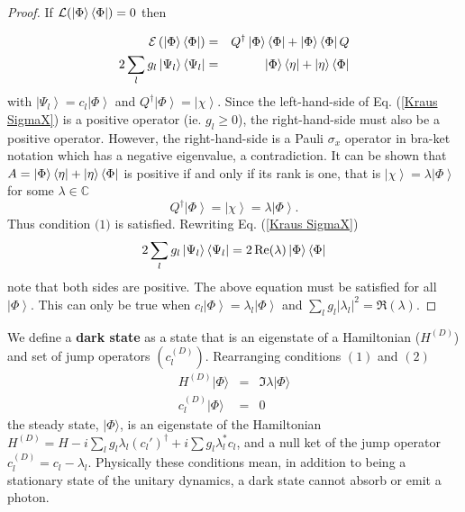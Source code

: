 \begin{proof}
If $\mathcal{L}( \left| \Phi \right\rangle \left\langle \Phi \right|  ) = 0$ then 

\begin{eqnarray}\label{Kraus SigmaX}
\mathcal{E} \left( \left| \Phi \right\rangle \left\langle \Phi \right| \right) & = & Q^\dagger \left| \Phi \right\rangle \left\langle \Phi \right| + \left| \Phi \right\rangle \left\langle \Phi \right| Q  \nonumber \\
2 \sum_l g_l \left| \Psi_l \right\rangle \left\langle \Psi_l \right| & = & \left| \Phi \right\rangle \left\langle \eta \right| + \left| \eta \right\rangle \left\langle \Phi \right|  
\end{eqnarray}
with $\left| \Psi_l \right\rangle = c_l \left| \Phi \right\rangle$ and $Q^\dagger \left| \Phi \right\rangle = \left| \chi \right\rangle$. Since the left-hand-side of Eq. (\ref{Kraus SigmaX}) is a positive operator (ie. $g_l \geq 0$), the right-hand-side must also be a positive operator. However, the right-hand-side is a Pauli $\sigma_x$ operator in bra-ket notation which has a negative eigenvalue, a contradiction. It can be shown that $A=\left| \Phi \right\rangle \left\langle \eta \right| + \left| \eta \right\rangle \left\langle \Phi \right|$ is positive if and only if its rank is one, that is $\left| \chi \right\rangle = \lambda \left| \Phi \right\rangle$ for some $\lambda \in \mathbb{C}$
\begin{equation}
Q^\dagger \left| \Phi \right\rangle = \left| \chi \right\rangle = \lambda \left| \Phi \right\rangle.
\end{equation}
Thus condition $\textit{(1)}$ is satisfied. Rewriting Eq. (\ref{Kraus SigmaX})
\begin{equation}
2 \sum_l g_l \left| \Psi_l \right\rangle \left\langle \Psi_l \right| = 2 \Re(\lambda) \left| \Phi \right\rangle \left\langle \Phi \right|
\end{equation}
note that both sides are positive. The above equation must be satisfied for all $\left| \Phi \right\rangle$. This can only be true when $c_l \left| \Phi \right\rangle= \lambda_l \left| \Phi \right\rangle$ and $\sum_l g_l |\lambda_l|^2 =\Re(\lambda) $.
\end{proof}
%
\par
%
We define a \textbf{dark state} as a state that is an eigenstate of a Hamiltonian ($H^{(D)}$) and set of jump operators $(c_l^{(D)})$. Rearranging conditions $(1)$ and $(2)$
\begin{eqnarray}\label{Eqn:DarkStateConditions}
H^{(D)} | \Phi \rangle & = & \Im{\lambda} | \Phi \rangle \nonumber \\ 
c_l^{(D)} | \Phi \rangle & = & 0
\end{eqnarray}
the steady state, $| \Phi \rangle$, is an eigenstate of the Hamiltonian $H^{(D)} = H - i \sum_l g_l \lambda_l (c_l')^\dagger + i \sum g_l \lambda_l^* c_l$, and a null ket of the jump operator $c_l^{(D)} = c_l - \lambda_l$.
Physically these conditions mean, in addition to being a stationary state of the unitary dynamics, a dark state cannot absorb or emit a photon.  


